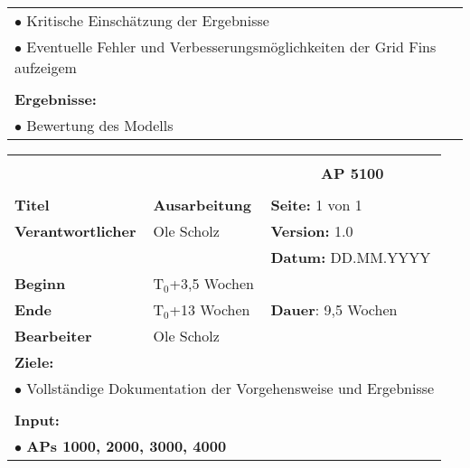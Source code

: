 \begin{table}[!h]
\begin{center}
\begin{tabular}{|p{35mm}||p{55mm}|p{50mm}||p{40mm}|}
			\multicolumn{4}{|p{150mm}|}{$\bullet$ Kritische Einschätzung der Ergebnisse}\\
			\multicolumn{4}{|p{150mm}|}{$\bullet$ Eventuelle Fehler und Verbesserungsmöglichkeiten der Grid Fins aufzeigem}\\
			\multicolumn{4}{|p{150mm}|}{}\\
			\multicolumn{4}{|p{150mm}|}{\textbf{Ergebnisse:}}\\
			\multicolumn{4}{|p{150mm}|}{$\bullet$ Bewertung des Modells}\\
			\hline
		\end{tabular}
	\end{center}
\end{table}

\clearpage
\begin{table}[!h]
	\begin{center}
		\begin{tabular}{|p{35mm}||p{55mm}|p{50mm}||p{40mm}|}
			\hline
			\multicolumn{3}{|l||}{\textbf{}} & \multicolumn{1}{c|}{}\\
			\multicolumn{3}{|l||}{\textbf{}} & \multicolumn{1}{c|}{\textbf{AP 5100}}\\
			\multicolumn{3}{|l||}{\textbf{}} & \multicolumn{1}{c|}{}\\
			\hline\hline
			\textbf{Titel} & \multicolumn{2}{p{7cm}||}{\textbf{Ausarbeitung}} 
			& \textbf{Seite:} 1 von 1\\
			\hline
			\textbf{Verantwortlicher} & \multicolumn{2}{l||}{Ole Scholz} & \textbf{Version:} 1.0\\
			\hline
			\multicolumn{3}{|l||}{} & \textbf{Datum:} DD.MM.YYYY\\
			\hline\hline
			\textbf{Beginn} & \multicolumn{2}{l||}{T$_0$+3,5 Wochen} & \\
			\hline
			\textbf{Ende} & \multicolumn{2}{l||}{T$_0$+13 Wochen} & \textbf{Dauer}: 9,5 Wochen\\
			\hline\hline
			\textbf{Bearbeiter} & \multicolumn{3}{l|}{Ole Scholz}\\
			\hline\hline
			\multicolumn{4}{|p{150mm}|}{\textbf{Ziele:}}\\
			\multicolumn{4}{|p{150mm}|}{$\bullet$ Vollständige Dokumentation der Vorgehensweise und Ergebnisse}\\
			\multicolumn{4}{|p{150mm}|}{}\\
			\multicolumn{4}{|p{150mm}|}{\textbf{Input:}}\\
			\multicolumn{4}{|p{150mm}|}{$\bullet$ \textbf{APs 1000, 2000, 3000, 4000}}\\

\end{tabular}
\end{center}
\end{table}
